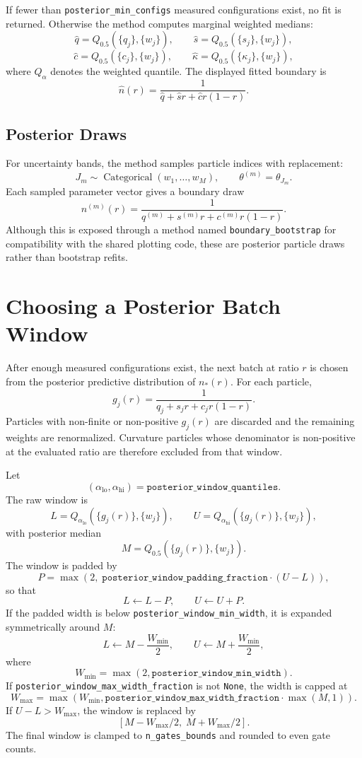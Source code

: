 \documentclass[11pt]{article}
\begin{document}
If fewer than \texttt{posterior\_min\_configs} measured configurations exist,
no fit is returned. Otherwise the method computes marginal weighted medians:
\[
    \hat q = Q_{0.5}(\{q_j\},\{w_j\}), \qquad
    \hat s = Q_{0.5}(\{s_j\},\{w_j\}),
\]
\[
    \hat c = Q_{0.5}(\{c_j\},\{w_j\}), \qquad
    \hat \kappa = Q_{0.5}(\{\kappa_j\},\{w_j\}),
\]
where $Q_\alpha$ denotes the weighted quantile. The displayed fitted boundary
is
\[
    \hat n(r)=\frac{1}{\hat q+\hat s r+\hat c r(1-r)}.
\]

\subsection{Posterior Draws}

For uncertainty bands, the method samples particle indices with replacement:
\[
    J_m \sim \operatorname{Categorical}(w_1,\ldots,w_M),
    \qquad
    \theta^{(m)}=\theta_{J_m}.
\]
Each sampled parameter vector gives a boundary draw
\[
    n^{(m)}(r)=
    \frac{1}{q^{(m)}+s^{(m)}r+c^{(m)}r(1-r)}.
\]
Although this is exposed through a method named \texttt{boundary\_bootstrap}
for compatibility with the shared plotting code, these are posterior particle
draws rather than bootstrap refits.

\section{Choosing a Posterior Batch Window}

After enough measured configurations exist, the next batch at ratio $r$ is
chosen from the posterior predictive distribution of $n_*(r)$. For each
particle,
\[
    g_j(r)=\frac{1}{q_j+s_j r+c_jr(1-r)}.
\]
Particles with non-finite or non-positive $g_j(r)$ are discarded and the
remaining weights are renormalized. Curvature particles whose denominator is
non-positive at the evaluated ratio are therefore excluded from that window.

Let
\[
    (\alpha_{\mathrm{lo}},\alpha_{\mathrm{hi}})
    =
    \texttt{posterior\_window\_quantiles}.
\]
The raw window is
\[
    L = Q_{\alpha_{\mathrm{lo}}}(\{g_j(r)\},\{w_j\}),
    \qquad
    U = Q_{\alpha_{\mathrm{hi}}}(\{g_j(r)\},\{w_j\}),
\]
with posterior median
\[
    M = Q_{0.5}(\{g_j(r)\},\{w_j\}).
\]
The window is padded by
\[
    P = \max\left(2,\;
        \texttt{posterior\_window\_padding\_fraction}\cdot(U-L)
    \right),
\]
so that
\[
    L \leftarrow L-P, \qquad U \leftarrow U+P.
\]
If the padded width is below \texttt{posterior\_window\_min\_width}, it is
expanded symmetrically around $M$:
\[
    L \leftarrow M-\frac{W_{\min}}{2}, \qquad
    U \leftarrow M+\frac{W_{\min}}{2},
\]
where
\[
    W_{\min}=\max(2,\texttt{posterior\_window\_min\_width}).
\]
If \texttt{posterior\_window\_max\_width\_fraction} is not \texttt{None}, the
width is capped at
\[
    W_{\max} =
    \max\left(
        W_{\min},
        \texttt{posterior\_window\_max\_width\_fraction}\cdot\max(M,1)
    \right).
\]
If $U-L>W_{\max}$, the window is replaced by
\[
    [M-W_{\max}/2,\; M+W_{\max}/2].
\]
The final window is clamped to \texttt{n\_gates\_bounds} and rounded to even
gate counts.
\end{document}
